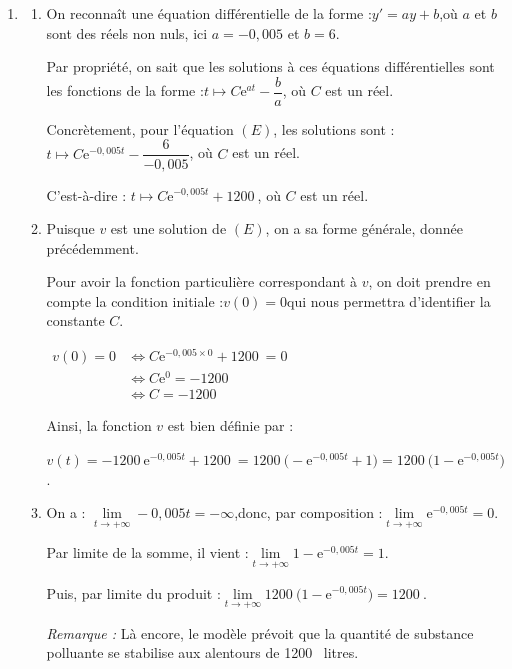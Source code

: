 \documentclass[10pt]{article}
\providecommand{\e}{{\mathrm{e}}}
\providecommand{\np}[2][]{{#2~#1}}
\begin{document}
\begin{enumerate}
	\item \begin{enumerate}
		\item On reconnaît une équation différentielle de la forme :\quad $y' = ay + b$,\quad où $a$ et $b$ sont des réels non nuls, ici $a = -0,005$ et $b = 6$.

		Par propriété, on sait que les solutions à ces équations différentielles sont les fonctions de la forme :\quad $t \longmapsto C\e^{at} - \dfrac{b}{a}$, \quad où $C$ est un réel.

		Concrètement, pour l'équation $(E)$, les solutions sont : \quad $t \longmapsto C\e^{-0,005t} - \dfrac{6}{-0,005}$, \quad où $C$ est un réel.

		C'est-à-dire : \quad $t \longmapsto C\e^{-0,005t} +\np{1200}$, \quad où $C$ est un réel.

		\item Puisque $v$ est une solution de $(E)$, on a sa forme générale, donnée précédemment.

		Pour avoir la fonction particulière correspondant à $v$, on doit prendre en compte la condition initiale :\quad $v(0) = 0$\quad qui nous permettra d'identifier la constante $C$.

		$\begin{aligned}
			v(0) = 0
			&\iff C\e^{-0,005\times 0} +\np{1200} = 0\\
			&\iff C\e^{0} = -\np{1200} \\
			&\iff C = -\np{1200}
		\end{aligned}$

		Ainsi, la fonction $v$ est bien définie par :

		$v(t) = -\np{1200}\e^{-0,005t} +\np{1200} = \np{1200}\big(-\e^{-0,005t} + 1\big) = \np{1200}\big(1 -\e^{-0,005t}\big)$.

		\item On a : \quad $\lim\limits_{t \to +\infty} -0,005t = - \infty$,\quad donc, par composition :\quad $\lim\limits_{t \to +\infty}\e^{-0,005t} = 0$.

		Par limite de la somme, il vient :\quad $\lim\limits_{t \to +\infty} 1 - \e^{-0,005t} = 1$.

		Puis, par limite du produit :\quad $\lim\limits_{t \to +\infty}\np{1200}\big(1-\e^{-0,005t}\big) = \np{1200}$.

		\emph{Remarque :} Là encore, le modèle prévoit que la quantité de substance polluante se stabilise aux alentours de \np{1200} litres.


\end{enumerate}
\end{enumerate}
\end{document}
